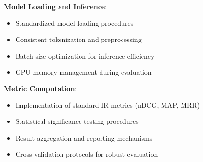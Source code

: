 \textbf{Model Loading and Inference}:
\begin{itemize}
    \item Standardized model loading procedures
    \item Consistent tokenization and preprocessing
    \item Batch size optimization for inference efficiency
    \item GPU memory management during evaluation
\end{itemize}

\textbf{Metric Computation}:
\begin{itemize}
    \item Implementation of standard IR metrics (nDCG, MAP, MRR)
    \item Statistical significance testing procedures
    \item Result aggregation and reporting mechanisms
    \item Cross-validation protocols for robust evaluation
\end{itemize}




    
    
    

 

